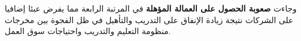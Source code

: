 وجاءت \textbf{صعوبة الحصول على العمالة المؤهلة} في المرتبة الرابعة مما يفرض عبئا إضافيا على الشركات نتيجة زيادة الإنفاق على التدريب والتأهيل في ظل الفجوة بين مخرجات منظومة التعليم والتدريب واحتياجات سوق العمل.
